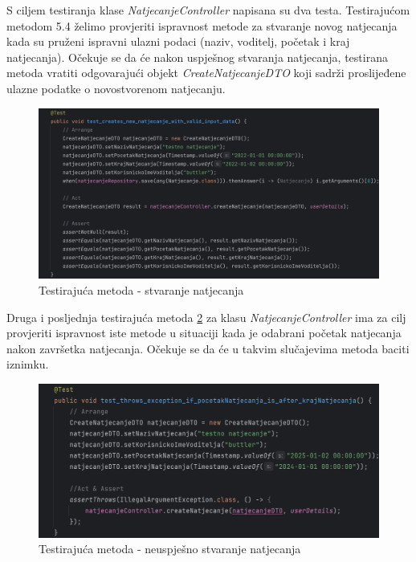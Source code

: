 S ciljem testiranja klase \textit{NatjecanjeController} napisana su dva testa. Testirajućom metodom 5.4 želimo provjeriti ispravnost metode za stvaranje novog natjecanja kada su pruženi ispravni ulazni podaci (naziv, voditelj, početak i kraj natjecanja). Očekuje se da će nakon uspješnog stvaranja natjecanja, testirana metoda vratiti odgovarajući objekt \textit{CreateNatjecanjeDTO} koji sadrži proslijeđene ulazne podatke o novostvorenom natjecanju.

\begin{figure}[H]
	\includegraphics[scale=0.15]{slike/test4.png}
	\centering
	\caption{Testirajuća metoda - stvaranje natjecanja}
	\label{fig:test4}
\end{figure}

Druga i posljednja testirajuća metoda \ref{fig:test5} za klasu \textit{NatjecanjeController} ima za cilj provjeriti ispravnost iste metode u situaciji kada je odabrani početak natjecanja nakon završetka natjecanja. Očekuje se da će u takvim slučajevima metoda baciti iznimku.

\begin{figure}[H]
	\includegraphics[scale=0.2]{slike/test5.png}
	\centering
	\caption{Testirajuća metoda - neuspješno stvaranje natjecanja}
	\label{fig:test5}
\end{figure}

